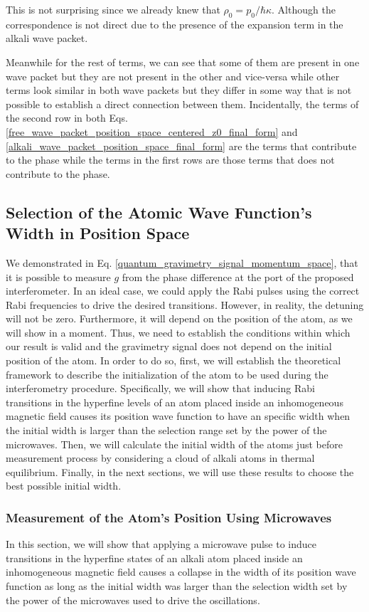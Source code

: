 \documentclass{article}
\begin{document}
This is not surprising since we already knew that $\rho_{0}=p_{0}/\hbar \kappa$. Although the correspondence is not direct due to the presence of the expansion term in the alkali wave packet.

Meanwhile for the rest of terms, we can see that some of them are present in one wave packet but they are not present in the other and vice-versa while other terms look similar in both wave packets but they differ in some way that is not possible to establish a direct connection between them. Incidentally, the terms of the second row in both Eqs. \ref{free_wave_packet_position_space_centered_z0_final_form} and \ref{alkali_wave_packet_position_space_final_form} are the terms that contribute to the phase while the terms in the first rows are those terms that does not contribute to the phase.

\subsection{Selection of the Atomic Wave Function's Width in Position Space}
We demonstrated in Eq. \ref{quantum_gravimetry_signal_momentum_space}, that it is possible to measure $g$ from the phase difference at the port of the proposed interferometer. In an ideal case, we could apply the Rabi pulses using the correct Rabi frequencies to drive the desired transitions. However, in reality, the detuning will not be zero. Furthermore, it will depend on the position of the atom, as we will show in a moment. Thus, we need to establish the conditions within which our result is valid and the gravimetry signal does not depend on the initial position of the atom.
In order to do so, first, we will establish the theoretical framework to describe the initialization of the atom to be used during the interferometry procedure. Specifically, we will show that inducing Rabi transitions in the hyperfine levels of an atom placed inside an inhomogeneous magnetic field causes its position wave function to have an specific width when the initial width is larger than the selection range set by the power of the microwaves. Then, we will calculate the initial width of the atoms just before measurement process by considering a cloud of alkali atoms in thermal equilibrium. Finally, in the next sections, we will use these results to choose the best possible initial width.

\subsubsection{Measurement of the Atom's Position Using Microwaves}
In this section, we will show that applying a microwave pulse to induce transitions in the hyperfine states of an alkali atom placed inside an inhomogeneous magnetic field causes a collapse in the width of its position wave function as long as the initial width was larger than the selection width set by the power of the microwaves used to drive the oscillations. 
\end{document}
